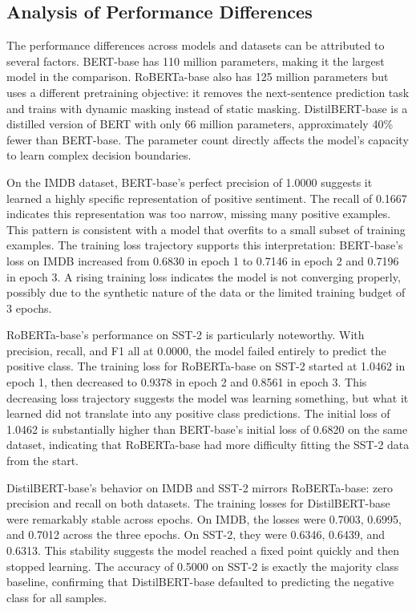 \documentclass[conference]{IEEEtran}
\begin{document}
\subsection{Analysis of Performance Differences}

The performance differences across models and datasets can be attributed to several factors. BERT-base has 110 million parameters, making it the largest model in the comparison. RoBERTa-base also has 125 million parameters but uses a different pretraining objective: it removes the next-sentence prediction task and trains with dynamic masking instead of static masking. DistilBERT-base is a distilled version of BERT with only 66 million parameters, approximately 40\% fewer than BERT-base. The parameter count directly affects the model's capacity to learn complex decision boundaries.

On the IMDB dataset, BERT-base's perfect precision of 1.0000 suggests it learned a highly specific representation of positive sentiment. The recall of 0.1667 indicates this representation was too narrow, missing many positive examples. This pattern is consistent with a model that overfits to a small subset of training examples. The training loss trajectory supports this interpretation: BERT-base's loss on IMDB increased from 0.6830 in epoch 1 to 0.7146 in epoch 2 and 0.7196 in epoch 3. A rising training loss indicates the model is not converging properly, possibly due to the synthetic nature of the data or the limited training budget of 3 epochs.

RoBERTa-base's performance on SST-2 is particularly noteworthy. With precision, recall, and F1 all at 0.0000, the model failed entirely to predict the positive class. The training loss for RoBERTa-base on SST-2 started at 1.0462 in epoch 1, then decreased to 0.9378 in epoch 2 and 0.8561 in epoch 3. This decreasing loss trajectory suggests the model was learning something, but what it learned did not translate into any positive class predictions. The initial loss of 1.0462 is substantially higher than BERT-base's initial loss of 0.6820 on the same dataset, indicating that RoBERTa-base had more difficulty fitting the SST-2 data from the start.

DistilBERT-base's behavior on IMDB and SST-2 mirrors RoBERTa-base: zero precision and recall on both datasets. The training losses for DistilBERT-base were remarkably stable across epochs. On IMDB, the losses were 0.7003, 0.6995, and 0.7012 across the three epochs. On SST-2, they were 0.6346, 0.6439, and 0.6313. This stability suggests the model reached a fixed point quickly and then stopped learning. The accuracy of 0.5000 on SST-2 is exactly the majority class baseline, confirming that DistilBERT-base defaulted to predicting the negative class for all samples.
\end{document}
